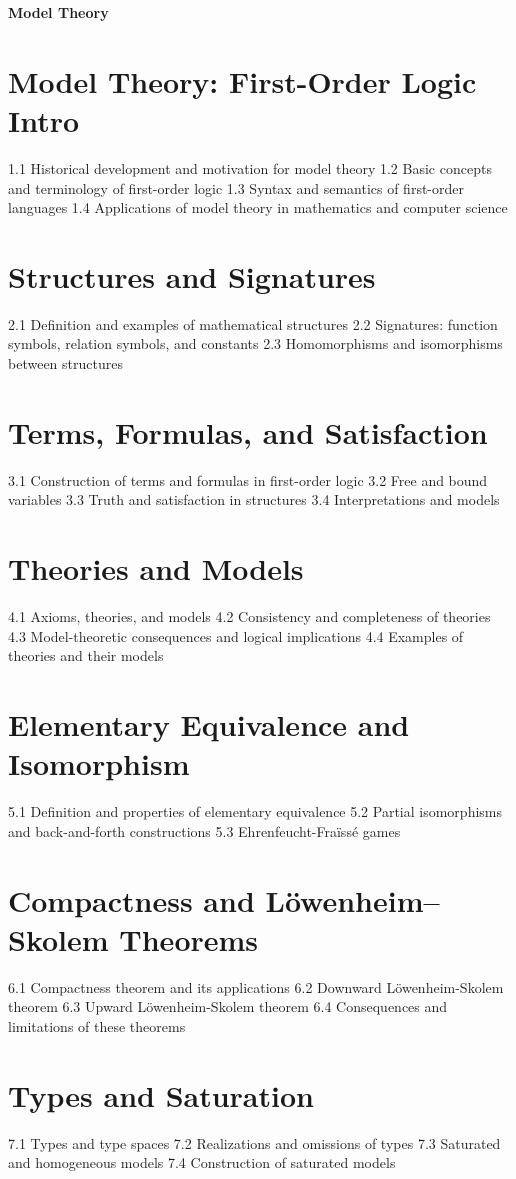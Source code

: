 ﻿{\LARGE \bf{Model Theory}}
\section{Model Theory: First-Order Logic Intro}
1.1 Historical development and motivation for model theory
1.2 Basic concepts and terminology of first-order logic
1.3 Syntax and semantics of first-order languages
1.4 Applications of model theory in mathematics and computer science
\section{Structures and Signatures}
2.1 Definition and examples of mathematical structures
2.2 Signatures: function symbols, relation symbols, and constants
2.3 Homomorphisms and isomorphisms between structures
\section{Terms, Formulas, and Satisfaction}
3.1 Construction of terms and formulas in first-order logic
3.2 Free and bound variables
3.3 Truth and satisfaction in structures
3.4 Interpretations and models
\section{Theories and Models}
4.1 Axioms, theories, and models
4.2 Consistency and completeness of theories
4.3 Model-theoretic consequences and logical implications
4.4 Examples of theories and their models
\section{Elementary Equivalence and Isomorphism}
5.1 Definition and properties of elementary equivalence
5.2 Partial isomorphisms and back-and-forth constructions
5.3 Ehrenfeucht-Fraïssé games
\section{Compactness and Löwenheim–Skolem Theorems}
6.1 Compactness theorem and its applications
6.2 Downward Löwenheim-Skolem theorem
6.3 Upward Löwenheim-Skolem theorem
6.4 Consequences and limitations of these theorems
\section{Types and Saturation}
7.1 Types and type spaces
7.2 Realizations and omissions of types
7.3 Saturated and homogeneous models
7.4 Construction of saturated models
